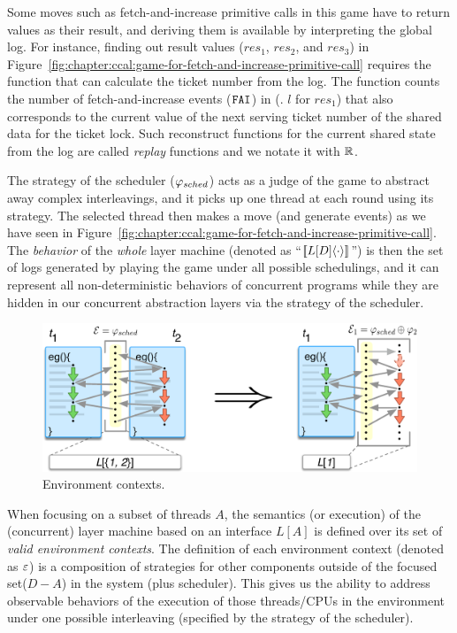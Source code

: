 Some moves such as fetch-and-increase primitive calls in this game have to return values as their result,
and deriving them is available by interpreting the global log. 
For instance, finding out result values ($res_1$, $res_2$, and $res_3$) in Figure~\ref{fig:chapter:ccal:game-for-fetch-and-increase-primitive-call}
requires the function that can calculate the ticket number from the log.
The function counts the number of fetch-and-increase events (${\mathrm{\texttt{FAI}}}$) in (\eg. $l$ for $res_1$) that
also corresponds to the current value of the next serving ticket number of the shared data for the ticket lock.
Such reconstruct functions for the current shared state from the log are called \emph{replay} functions and we notate it with $\mathbb{R}$.

The strategy of the scheduler ($\varphi_{sched}$) acts as a judge of the game to abstract away complex interleavings, 
and it picks up one thread at each round using its strategy. 
The selected thread then makes a move  (and generate events)  as we have seen in Figure~\ref{fig:chapter:ccal:game-for-fetch-and-increase-primitive-call}.
The \emph{behavior} of the \emph{whole} layer machine (denoted as ``$[\![{L[D]} \langle {\cdot} \rangle]\!]$'') 
is then the set of  logs generated by playing the game under all possible schedulings, and it can represent all non-deterministic behaviors of concurrent programs 
while they are hidden in our concurrent abstraction layers via the strategy of the scheduler.

\begin{figure}[t]
\centering
\includegraphics[scale=0.6]{figs/ccal/pcomp}
\caption{Environment contexts.}
\label{fig:chapter:ccal:env-contexs}
\end{figure}

When focusing on a subset of threads $A$, the semantics (or execution) of the (concurrent) layer machine based on an
interface $L[A]$ is defined over its set of \emph{valid environment
contexts}. 
The definition of each  environment context (denoted as $\oracle$) is
a composition  of strategies for other components outside of the focused set($D - A$) in the 
system (plus scheduler).
This gives us the ability to address observable behaviors of the
execution of those threads/CPUs in the environment under one possible
interleaving (specified by the strategy of the scheduler).

